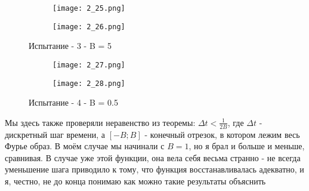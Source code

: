 \begin{figure}[!ht]
	\centering
\hspace*{\fill}%
	\begin{subfigure}[b]{0.49\textwidth}
        \centering
		\texttt{[image: 2\_25.png]}
	\end{subfigure}
\hfill
	\begin{subfigure}[b]{0.49\textwidth}
        \centering
		\texttt{[image: 2\_26.png]}
	\end{subfigure}
    \caption{ Испытание - 3 - B = 5}
\end{figure}
\newpage
\begin{figure}[!ht]
	\centering
\hspace*{\fill}%
	\begin{subfigure}[b]{0.49\textwidth}
        \centering
		\texttt{[image: 2\_27.png]}
	\end{subfigure}
\hfill
	\begin{subfigure}[b]{0.49\textwidth}
        \centering
		\texttt{[image: 2\_28.png]}
	\end{subfigure}
    \caption{ Испытание - 4 - B = 0.5}
\end{figure}



Мы здесь также проверяли неравенство из теоремы: $\Delta t < \frac{1}{2B}$, где $\Delta t$ -  дискретный шаг времени, 
а $[-B; B]$ - конечный отрезок, в котором лежим весь Фурье образ. В моём случае мы начинали с $B=1$, но я брал и больше и меньше, сравнивая. В случае уже этой функции, она вела себя весьма странно - не всегда уменьшение шага приводило к тому, 
что функция восстанавливалась адекватно, и я, честно, не до конца понимаю как можно такие результаты объяснить

\endinput